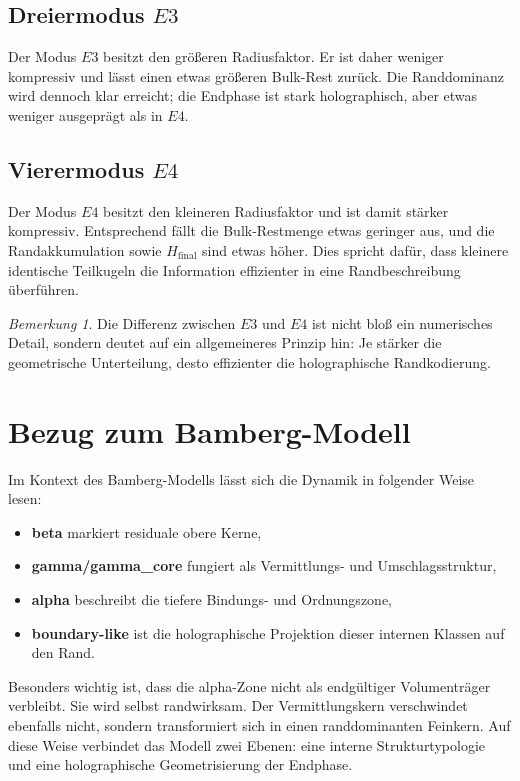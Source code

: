 \documentclass[11pt,a4paper]{article}
\theoremstyle{definition}
\theoremstyle{remark}
\newtheorem{bemerkung}{Bemerkung}
\begin{document}
	\subsection{Dreiermodus $E3$}
	Der Modus $E3$ besitzt den größeren Radiusfaktor. Er ist daher weniger kompressiv und lässt einen etwas größeren Bulk-Rest zurück. Die Randdominanz wird dennoch klar erreicht; die Endphase ist stark holographisch, aber etwas weniger ausgeprägt als in $E4$.
	
	\subsection{Vierermodus $E4$}
	Der Modus $E4$ besitzt den kleineren Radiusfaktor und ist damit stärker kompressiv. Entsprechend fällt die Bulk-Restmenge etwas geringer aus, und die Randakkumulation sowie $H_{\mathrm{final}}$ sind etwas höher. Dies spricht dafür, dass kleinere identische Teilkugeln die Information effizienter in eine Randbeschreibung überführen.
	
	\begin{bemerkung}
		Die Differenz zwischen $E3$ und $E4$ ist nicht bloß ein numerisches Detail, sondern deutet auf ein allgemeineres Prinzip hin: Je stärker die geometrische Unterteilung, desto effizienter die holographische Randkodierung.
	\end{bemerkung}
	
	\section{Bezug zum Bamberg-Modell}
	Im Kontext des Bamberg-Modells lässt sich die Dynamik in folgender Weise lesen:
	\begin{itemize}[leftmargin=2em]
		\item \textbf{beta} markiert residuale obere Kerne,
		\item \textbf{gamma/gamma\_core} fungiert als Vermittlungs- und Umschlagsstruktur,
		\item \textbf{alpha} beschreibt die tiefere Bindungs- und Ordnungszone,
		\item \textbf{boundary-like} ist die holographische Projektion dieser internen Klassen auf den Rand.
	\end{itemize}
	
	Besonders wichtig ist, dass die alpha-Zone nicht als endgültiger Volumenträger verbleibt. Sie wird selbst randwirksam. Der Vermittlungskern verschwindet ebenfalls nicht, sondern transformiert sich in einen randdominanten Feinkern. Auf diese Weise verbindet das Modell zwei Ebenen: eine interne Strukturtypologie und eine holographische Geometrisierung der Endphase.
	
\end{document}

